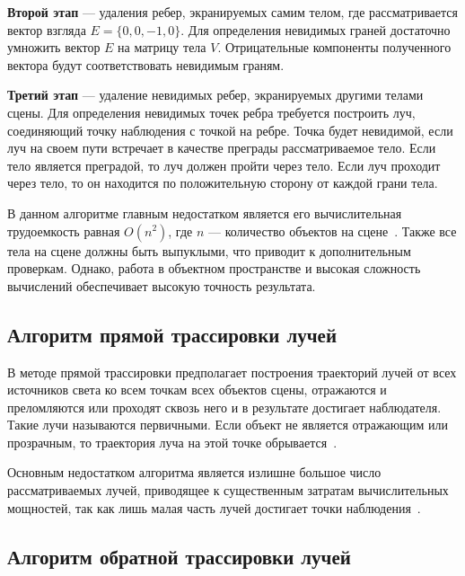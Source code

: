 \documentclass[a4paper, 14pt]{extreport}
\begin{document}
\textbf{Второй этап} --- удаления ребер, экранируемых самим телом, где рассматривается вектор взгляда $E = \{0, 0, -1, 0\}$.
Для определения невидимых граней достаточно умножить вектор $E$ на матрицу тела $V$. Отрицательные компоненты 
полученного вектора будут соответствовать невидимым граням.

\textbf{Третий этап} --- удаление невидимых ребер, экранируемых другими телами сцены. 
Для определения невидимых точек ребра требуется построить луч, соединяющий точку наблюдения с точкой на ребре. 
Точка будет невидимой, если луч на своем пути встречает в качестве преграды рассматриваемое тело. 
Если тело является преградой, то луч должен пройти через тело.  Если луч проходит через тело, то он находится по 
положительную сторону от каждой грани тела.

В данном алгоритме главным недостатком является его вычислительная трудоемкость равная $O(n^2)$, где $n$ --- количество 
объектов на сцене~\cite{rodjers}. Также все тела на сцене должны быть выпуклыми, что приводит к дополнительным проверкам.
Однако, работа в объектном пространстве и высокая сложность вычислений обеспечивает высокую точность результата.

\subsection{Алгоритм прямой трассировки лучей}

В методе прямой трассировки предполагает построения траекторий лучей от всех источников света ко всем точкам всех 
объектов сцены, отражаются и преломляются или проходят сквозь него и в результате достигает наблюдателя. Такие лучи 
называются первичными. Если объект не является отражающим или прозрачным, то траектория луча на этой точке 
обрывается~\cite{ulianov}.

Основным недостатком алгоритма является излишне большое число рассматриваемых лучей, приводящее к существенным 
затратам вычислительных мощностей, так как лишь малая часть лучей достигает точки наблюдения~\cite{livshic}.

\subsection{Алгоритм обратной трассировки лучей}
\end{document}
